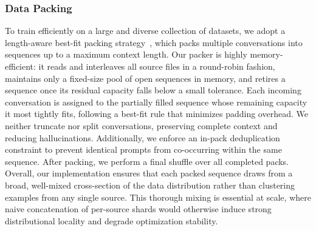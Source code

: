 \subsubsection{Data Packing}
To train efficiently on a large and diverse collection of datasets, we adopt a length-aware best-fit packing strategy~\citep{ding2024fewer}, which packs multiple conversations into sequences up to a maximum context length. 
Our packer is highly memory-efficient: it reads and interleaves all source files in a round-robin fashion, maintains only a fixed-size pool of open sequences in memory, and retires a sequence once its residual capacity falls below a small tolerance. 
Each incoming conversation is assigned to the partially filled sequence whose remaining capacity it most tightly fits, following a best-fit rule that minimizes padding overhead. 
We neither truncate nor split conversations, preserving complete context and reducing hallucinations. 
Additionally, we enforce an in-pack deduplication constraint to prevent identical prompts from co-occurring within the same sequence. 
After packing, we perform a final shuffle over all completed packs. 
Overall, our implementation ensures that each packed sequence draws from a broad, well-mixed cross-section of the data distribution rather than clustering examples from any single source. 
This thorough mixing is essential at scale, where naive concatenation of per-source shards would otherwise induce strong distributional locality and degrade optimization stability.